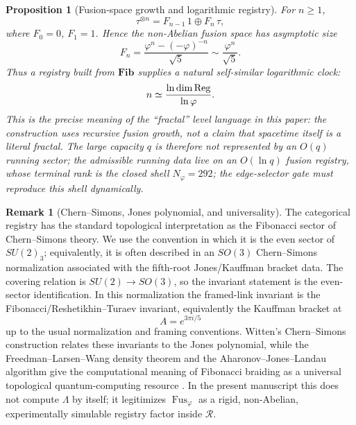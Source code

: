 \documentclass[aps,prd,reprint,nofootinbib,superscriptaddress,floatfix]{revtex4-2}
\numberwithin{equation}{section}
\theoremstyle{definition}
\newtheorem{remark}{Remark}[section]
\theoremstyle{plain}
\newtheorem{proposition}{Proposition}[section]
\begin{document}
\begin{proposition}[Fusion-space growth and logarithmic registry]
\label{prop:fib-growth-registry}
For \(n\ge1\),
\begin{equation}
\tau^{\otimes n}
=
F_{n-1}\,1\oplus F_n\,\tau,
\end{equation}
where \(F_0=0\), \(F_1=1\).  Hence the non-Abelian fusion space has
asymptotic size
\begin{equation}
F_n=\frac{\varphi^n-(-\varphi)^{-n}}{\sqrt5}
\sim \frac{\varphi^n}{\sqrt5}.
\end{equation}
Thus a registry built from \(\mathbf{Fib}\) supplies a natural
self-similar logarithmic clock:
\begin{equation}
n\simeq \frac{\ln\dim{\rm Reg}}{\ln\varphi}.
\end{equation}
This is the precise meaning of the ``fractal'' level language in this
paper: the construction uses recursive fusion growth, not a claim that
spacetime itself is a literal fractal.  The large capacity \(q\) is
therefore not represented by an \(O(q)\) running sector; the admissible
running data live on an \(O(\ln q)\) fusion registry, whose terminal rank
is the closed shell \(N_\varphi=292\); the edge-selector gate must reproduce this shell dynamically.
\end{proposition}

\begin{remark}[Chern--Simons, Jones polynomial, and universality]
The categorical registry has the standard topological interpretation as
the Fibonacci sector of Chern--Simons theory.  We use the convention in
which it is the even sector of \(SU(2)_3\); equivalently, it is often
described in an \(SO(3)\) Chern--Simons normalization associated with the
fifth-root Jones/Kauffman bracket data.  The covering relation is
\(SU(2)\to SO(3)\), so the invariant statement is the even-sector
identification.  In this normalization the framed-link invariant is the
Fibonacci/Reshetikhin--Turaev invariant, equivalently the Kauffman bracket
at
\begin{equation}
A=e^{3\pi i/5}
\end{equation}
up to the usual normalization and framing conventions.  Witten's
Chern--Simons construction relates these invariants to the Jones
polynomial, while the Freedman--Larsen--Wang density theorem and the
Aharonov--Jones--Landau algorithm give the computational meaning of
Fibonacci braiding as a universal topological quantum-computing resource
\cite{Witten1989,FreedmanLarsenWang2002,AharonovJonesLandau2009}.
In the present manuscript this does not compute \(\Lambda\) by itself;
it legitimizes \(\operatorname{Fus}_\varphi\) as a rigid, non-Abelian,
experimentally simulable registry factor inside \(\mathcal R\).
\end{remark}
\end{document}
